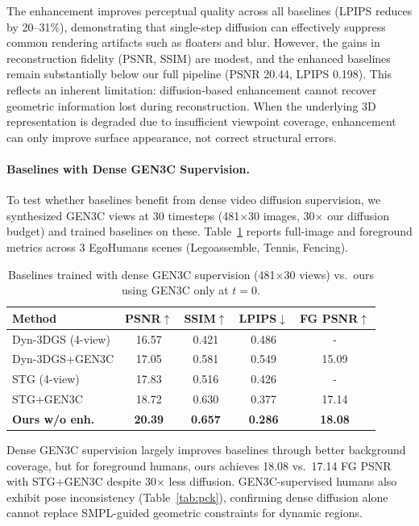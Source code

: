 \documentclass[acmtog]{acmart}
\begin{document}
The enhancement improves perceptual quality across all baselines (LPIPS reduces by 20--31\%), demonstrating that single-step diffusion can effectively suppress common rendering artifacts such as floaters and blur. However, the gains in reconstruction fidelity (PSNR, SSIM) are modest, and the enhanced baselines remain substantially below our full pipeline (PSNR 20.44, LPIPS 0.198). This reflects an inherent limitation: diffusion-based enhancement cannot recover geometric information lost during reconstruction. When the underlying 3D representation is degraded due to insufficient viewpoint coverage, enhancement can only improve surface appearance, not correct structural errors.

\paragraph{Baselines with Dense GEN3C Supervision.}
To test whether baselines benefit from dense video diffusion supervision, we synthesized GEN3C views at 30 timesteps (481$\times$30 images, 30$\times$ our diffusion budget) and trained baselines on these. Table~\ref{tab:gen3c_baselines} reports full-image and foreground metrics across 3 EgoHumans scenes (Legoassemble, Tennis, Fencing).

\begin{table}[tbp]
\centering
\caption{Baselines trained with dense GEN3C supervision (481$\times$30 views) vs.\ ours using GEN3C only at $t{=}0$.}
\label{tab:gen3c_baselines}
\begin{tabular}{l|ccc|c}
\toprule
Method & PSNR$\uparrow$ & SSIM$\uparrow$ & LPIPS$\downarrow$ & FG PSNR$\uparrow$ \\
\midrule
Dyn-3DGS (4-view) & 16.57 & 0.421 & 0.486 & - \\
Dyn-3DGS+GEN3C & 17.05 & 0.581 & 0.549 & 15.09 \\
STG (4-view) & 17.83 & 0.516 & 0.426 & - \\
STG+GEN3C & 18.72 & 0.630 & 0.377 & 17.14 \\
\textbf{Ours w/o enh.} & \textbf{20.39} & \textbf{0.657} & \textbf{0.286} & \textbf{18.08} \\
\bottomrule
\end{tabular}
\end{table}

Dense GEN3C supervision largely improves baselines through better background coverage, but for foreground humans, ours achieves 18.08 vs.\ 17.14 FG PSNR with STG+GEN3C despite 30$\times$ less diffusion. GEN3C-supervised humans also exhibit pose inconsistency (Table~\ref{tab:pck}), confirming dense diffusion alone cannot replace SMPL-guided geometric constraints for dynamic regions.
\end{document}
